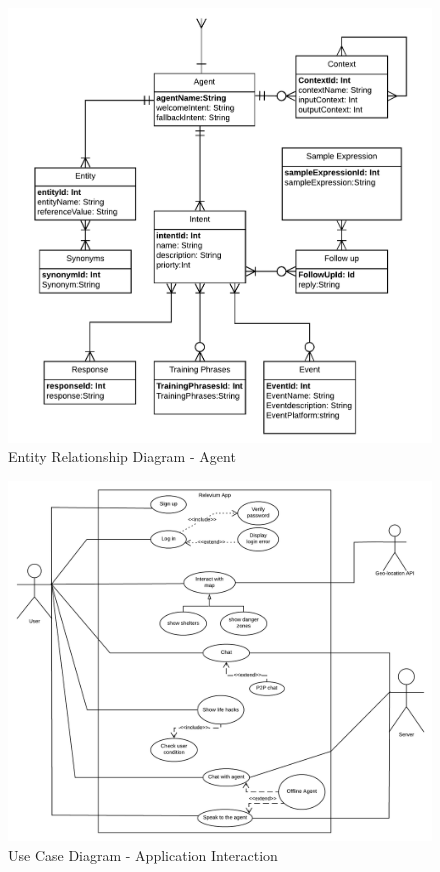 \documentclass{scrreprt}
\begin{document}
\clearpage
\begin{figure}[ht!]
    \centering
    \includegraphics[angle=0, width=\textwidth]{img2/erd2.pdf}
    \caption{Entity Relationship Diagram - Agent}
    \label{fig:erd2}
\end{figure}


\clearpage

\begin{figure}[ht!]
    \centering
    \includegraphics[width=\textwidth]{img3/UseCaseDiagram1.pdf}
    \caption{Use Case Diagram - Application Interaction}
    \label{fig:usecase1}
\end{figure}
\end{document}
